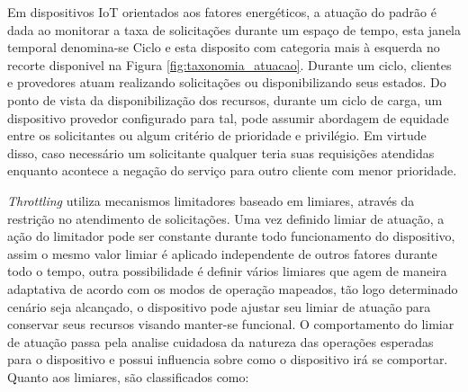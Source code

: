 Em dispositivos \acs{IoT} orientados aos fatores energéticos, a atuação do padrão é dada ao monitorar a taxa de solicitações durante um espaço de tempo, esta janela temporal denomina-se Ciclo e esta disposito com categoria mais à esquerda no recorte disponivel na Figura \ref{fig:taxonomia_atuacao}. Durante um ciclo, clientes e provedores atuam realizando solicitações ou disponibilizando seus estados. Do ponto de vista da disponibilização dos recursos, durante um ciclo de carga, um dispositivo provedor configurado para tal, pode assumir abordagem de equidade entre os solicitantes ou algum critério de prioridade e privilégio. Em virtude disso, caso necessário um solicitante qualquer teria suas requisições atendidas enquanto acontece a negação do serviço para outro cliente com menor prioridade.

\textit{Throttling} utiliza mecanismos limitadores baseado em limiares, através da restrição no atendimento de solicitações. Uma vez definido limiar de atuação, a ação do limitador pode ser constante durante todo funcionamento do dispositivo, assim o mesmo valor limiar é aplicado independente de outros fatores durante todo o tempo, outra possibilidade é definir vários limiares que agem de maneira adaptativa de acordo com os modos de operação mapeados, tão logo determinado cenário seja alcançado, o dispositivo pode ajustar seu limiar de atuação para conservar seus recursos visando manter-se funcional. O comportamento do limiar de atuação passa pela analise cuidadosa da natureza das operações esperadas para o dispositivo e possui influencia sobre como o dispositivo irá se comportar. Quanto aos limiares, são classificados  como:

